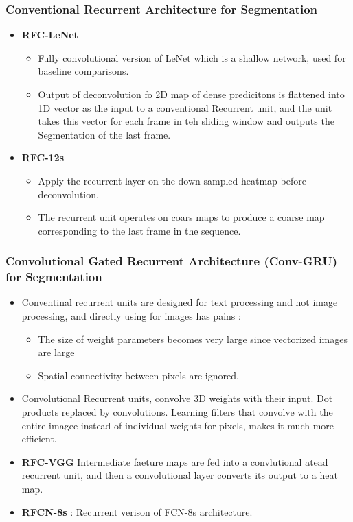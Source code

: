 \documentclass{article}
\begin{document}
\subsubsection{Conventional Recurrent Architecture for Segmentation}
\begin{itemize}
\item \textbf{RFC-LeNet}
  \begin{itemize}               %
  \item Fully convolutional version of LeNet which is a shallow network, used for baseline comparisons.
  \item Output of deconvolution fo 2D map of dense predicitons is flattened into 1D vector as the input to a conventional Recurrent unit, and the unit takes this vector for each frame in teh sliding window and outputs the Segmentation of the last frame.
  \end{itemize}
\item \textbf{RFC-12s}
  \begin{itemize}
  \item Apply the recurrent layer on the down-sampled heatmap before deconvolution.
  \item The recurrent unit operates on coars maps to produce a coarse map corresponding to the last frame in the sequence.
  \end{itemize}
\end{itemize}

\subsubsection{Convolutional Gated Recurrent Architecture (Conv-GRU) for Segmentation}
\begin{itemize}
\item Conventinal recurrent units are designed for text processing and not image processing, and directly using for images has pains :
  \begin{itemize}
  \item The size of weight parameters becomes very large since vectorized images are large
  \item Spatial connectivity between pixels are ignored.
  \end{itemize}
\item Convolutional Recurrent units, convolve 3D weights with their input. Dot products replaced by convolutions. Learning filters that convolve with the entire imagee instead of individual weights for pixels, makes it much more efficient.
\item \textbf{RFC-VGG}
    Intermediate faeture maps are fed into a convlutional atead recurrent unit, and then a convolutional layer converts its output to a heat map.
\item \textbf{RFCN-8s} : Recurrent verison of FCN-8s architecture.
\end{itemize}
\end{document}
